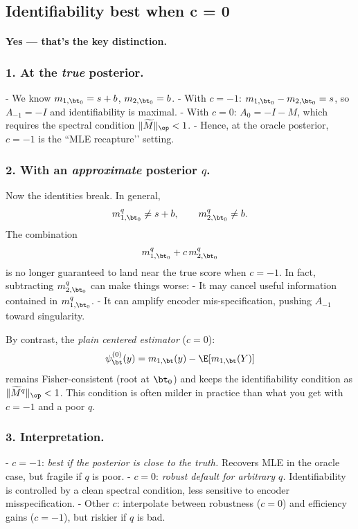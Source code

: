 \subsection{Identifiability  best when c = 0}

\paragraph{Yes — that’s the key distinction.}

\subsubsection*{1. At the \emph{true} posterior.}
- We know \(m_{1,\bt_0}=s+b\), \(m_{2,\bt_0}=b\).  
- With \(c=-1\): \(m_{1,\bt_0}-m_{2,\bt_0}=s\), so \(A_{-1}=-I\) and identifiability is maximal.  
- With \(c=0\): \(A_0=-I-M\), which requires the spectral condition \(\|\widetilde M\|_{\op}<1\).  
- Hence, at the oracle posterior, \(c=-1\) is the “MLE recapture’’ setting.

\subsubsection*{2. With an \emph{approximate} posterior \(q\).}
Now the identities break. In general,
\[
m_{1,\bt_0}^q \neq s+b, \qquad m_{2,\bt_0}^q \neq b.
\]
The combination
\[
m_{1,\bt_0}^q + c\,m_{2,\bt_0}^q
\]
is no longer guaranteed to land near the true score when \(c=-1\). In fact, subtracting \(m_{2,\bt_0}^q\) can make things worse:
- It may cancel useful information contained in \(m_{1,\bt_0}^q\).  
- It can amplify encoder mis-specification, pushing \(A_{-1}\) toward singularity.

By contrast, the \emph{plain centered estimator} (\(c=0\)):
\[
\psi_\bt^{(0)}(y)=m_{1,\bt}(y)-\E[m_{1,\bt}(Y)]
\]
remains Fisher-consistent (root at \(\bt_0\)) and keeps the identifiability condition as \(\|\widetilde M^q\|_{\op}<1\). This condition is often milder in practice than what you get with \(c=-1\) and a poor \(q\).

\subsubsection*{3. Interpretation.}
- \(c=-1\): \emph{best if the posterior is close to the truth.} Recovers MLE in the oracle case, but fragile if \(q\) is poor.  
- \(c=0\): \emph{robust default for arbitrary \(q\).} Identifiability is controlled by a clean spectral condition, less sensitive to encoder misspecification.  
- Other \(c\): interpolate between robustness (\(c=0\)) and efficiency gains (\(c=-1\)), but riskier if \(q\) is bad.

